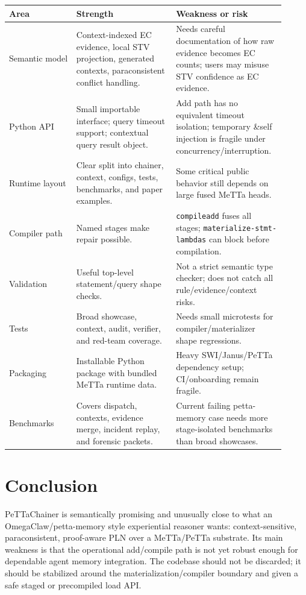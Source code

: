 \documentclass[11pt]{article}
\newcommand{\code}[1]{\texttt{#1}}
\begin{document}
\begin{longtable}{p{0.23\linewidth}p{0.34\linewidth}p{0.34\linewidth}}
\textbf{Area} & \textbf{Strength} & \textbf{Weakness or risk} \\
\hline
Semantic model & Context-indexed EC evidence, local STV projection, generated
contexts, paraconsistent conflict handling. & Needs careful documentation of how
raw evidence becomes EC counts; users may misuse STV confidence as EC evidence.
\\
Python API & Small importable interface; query timeout support; contextual
query result object. & Add path has no equivalent timeout isolation; temporary
\&self injection is fragile under concurrency/interruption. \\
Runtime layout & Clear split into chainer, context, configs, tests, benchmarks,
and paper examples. & Some critical public behavior still depends on large fused
MeTTa heads. \\
Compiler path & Named stages make repair possible. & \code{compileadd} fuses
all stages; \code{materialize-stmt-lambdas} can block before compilation.
\\
Validation & Useful top-level statement/query shape checks. & Not a strict
semantic type checker; does not catch all rule/evidence/context risks. \\
Tests & Broad showcase, context, audit, verifier, and red-team coverage. & Needs
small microtests for compiler/materializer shape regressions. \\
Packaging & Installable Python package with bundled MeTTa runtime data. & Heavy
SWI/Janus/PeTTa dependency setup; CI/onboarding remain fragile. \\
Benchmarks & Covers dispatch, contexts, evidence merge, incident replay, and
forensic packets. & Current failing petta-memory case needs more stage-isolated
benchmarks than broad showcases. \\
\end{longtable}

\section{Conclusion}

PeTTaChainer is semantically promising and unusually close to what an
OmegaClaw/petta-memory style experiential reasoner wants: context-sensitive,
paraconsistent, proof-aware PLN over a MeTTa/PeTTa substrate.  Its main weakness
is that the operational add/compile path is not yet robust enough for dependable
agent memory integration.  The codebase should not be discarded; it should be
stabilized around the materialization/compiler boundary and given a safe staged
or precompiled load API.
\end{document}
